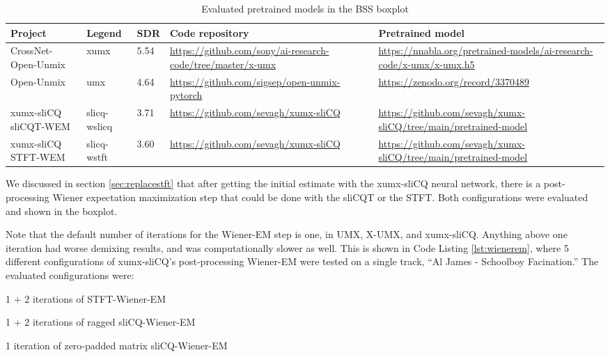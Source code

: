 \documentclass[report.tex]{subfiles}
\begin{document}
\begin{table}[ht]
	\centering
	\begin{tabular}{ |p{2.5cm}|l|l|p{3.5cm}|p{3.5cm}| }
	 \hline
		Project & Legend & SDR & Code repository & Pretrained model \\
	 \hline
	 \hline
		CrossNet-Open-Unmix & xumx & 5.54 & \url{https://github.com/sony/ai-research-code/tree/master/x-umx} & \url{https://nnabla.org/pretrained-models/ai-research-code/x-umx/x-umx.h5} \\
	 \hline
		Open-Unmix & umx & 4.64 & \url{https://github.com/sigsep/open-unmix-pytorch} & \url{https://zenodo.org/record/3370489} \\
	 \hline
		\makecell[l]{xumx-sliCQ \\ sliCQT-WEM} & slicq-wslicq & 3.71 & \url{https://github.com/sevagh/xumx-sliCQ} & \url{https://github.com/sevagh/xumx-sliCQ/tree/main/pretrained-model} \\
	 \hline
		\makecell[l]{xumx-sliCQ \\ STFT-WEM} & slicq-wstft & 3.60 & \url{https://github.com/sevagh/xumx-sliCQ} & \url{https://github.com/sevagh/xumx-sliCQ/tree/main/pretrained-model} \\
	 \hline
\end{tabular}
	\caption{Evaluated pretrained models in the BSS boxplot}
	\label{table:bsseval}
\end{table}

We discussed in section \ref{sec:replacestft} that after getting the initial estimate with the xumx-sliCQ neural network, there is a post-processing Wiener expectation maximization step that could be done with the sliCQT or the STFT. Both configurations were evaluated and shown in the boxplot.

Note that the default number of iterations for the Wiener-EM step is one, in UMX, X-UMX, and xumx-sliCQ. Anything above one iteration had worse demixing results, and was computationally slower as well. This is shown in Code Listing \ref{lst:wienerem}, where 5 different configurations of xumx-sliCQ's post-processing Wiener-EM were tested on a single track, ``Al James - Schoolboy Facination.'' The evaluated configurations were:
\begin{tight_enumerate}
	\item
		1 + 2 iterations of STFT-Wiener-EM
	\item
		1 + 2 iterations of ragged sliCQ-Wiener-EM
	\item
		1 iteration of zero-padded matrix sliCQ-Wiener-EM
\end{tight_enumerate}
\end{document}
